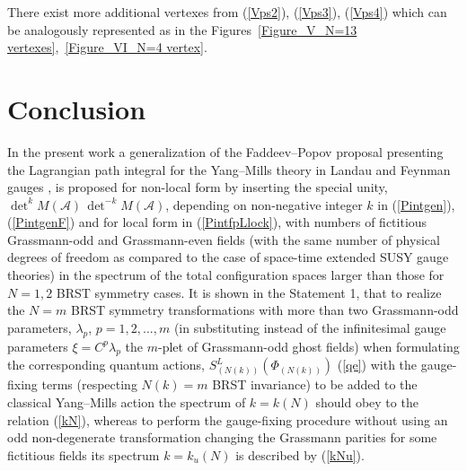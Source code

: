\documentclass[10pt]{article}
\begin{document}
There exist more additional vertexes from (\ref{Vps2}), (\ref{Vps3}), (\ref{Vps4}) which can be analogously represented as in the Figures~\ref{Figure_V_N=13 vertexes},~\ref{Figure_VI_N=4 vertex}.


\section{Conclusion}

In the present work  a generalization of the Faddeev--Popov proposal presenting the Lagrangian
path integral for the Yang--Mills theory in Landau and Feynman gauges \cite{fp}, \cite{fp-ghosts} is proposed  for non-local  form by inserting the special unity, ${\det}^{k} M(\mathcal{A}) \,  {\det}^{-k} M(\mathcal{A}) $, depending on non-negative  integer $k$     in  (\ref{Pintgen}), (\ref{PintgenF}) and for local form in (\ref{PintfpLlock}),
with numbers of fictitious Grassmann-odd and Grassmann-even fields (with the same number of physical degrees of freedom
as compared to the case of space-time extended  SUSY gauge theories) in the spectrum
of the total configuration spaces larger than those for $N=1,2$ BRST symmetry cases.
It is shown in the Statement 1, that to realize the $N=m$ BRST symmetry transformations with more than two Grassmann-odd parameters, $\lambda_p$, $p=1,2,...,m$  (in substituting instead of the infinitesimal gauge parameters $\xi = C^p \lambda_p $  the $m$-plet of Grassmann-odd ghost fields)  when formulating the corresponding quantum actions, $S^L_{(N(k))}(\Phi_{(N(k))})$ (\ref{qe}) with the  gauge-fixing terms
(respecting $N(k)=m$ BRST invariance) to be added to the classical Yang--Mills action the spectrum of $k=k(N)$ should obey to the relation (\ref{kN}), whereas to perform the gauge-fixing procedure without using an odd non-degenerate transformation changing the Grassmann parities for some fictitious fields   its spectrum  $k=k_u(N)$ is described  by (\ref{kNu}).
\end{document}
